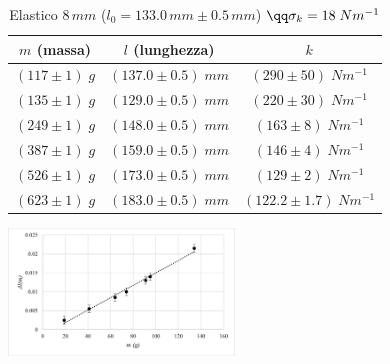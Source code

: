 

\begin{table}[h]
    \begin{subtable}[h]{0.45\textwidth}
    \begin{tabular}{|c|c|c|}
        \hline
        $m$ (massa) & $l$ (lunghezza) & $k$\\
        \hline

        $(117 \pm 1)\; g$  & $(137.0 \pm 0.5) \;mm$ & $(290 \pm 50)\; Nm^{-1}$\\ 
        $(135 \pm 1)\; g$  & $(129.0 \pm 0.5) \;mm$ & $(220 \pm 30)\; Nm^{-1}$\\ 
        $(249 \pm 1)\; g$  & $(148.0 \pm 0.5) \;mm$ & $(163 \pm 8)\; Nm^{-1}$\\ 
        $(387 \pm 1)\; g$  & $(159.0 \pm 0.5) \;mm$ & $(146 \pm 4)\; Nm^{-1}$\\ 
        $(526 \pm 1)\; g$  & $(173.0 \pm 0.5) \;mm$ & $(129 \pm 2)\; Nm^{-1}$\\ 
        $(623 \pm 1)\; g$  & $(183.0 \pm 0.5) \;mm$ & $(122.2 \pm 1.7)\; Nm^{-1}$\\ 


        \hline
    \end{tabular}
    \end{subtable}
    \hfill
    \begin{subtable}[h]{0.45\textwidth}
        \includegraphics[width = 6cm]{plots/plt2mm.png}
    \end{subtable}
    \caption{Elastico $8\,mm$ ($l_0 = 133.0\, mm \pm 0.5\,mm$) $\qq \sigma_k = 18 \; Nm^{-1}$}
    \label{tabellaElasitco8}
\end{table}

